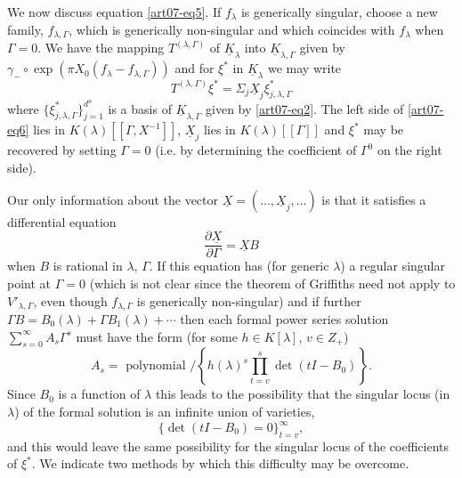 We now discuss equation \eqref{art07-eq5}. If $f_{\lambda}$ is generically singular, choose a new family, $f_{\lambda,\Gamma}$, which is generically non-singular and which coincides with $f_{\lambda}$ when $\Gamma=0$. We have the mapping $T^{(\lambda,\Gamma)}$ of $\underline{K}_{\lambda}$ into $\underline{K}_{\lambda,\Gamma}$ given by $\gamma_{-}\circ \exp (\pi X_{0}(f_{\lambda}-f_{\lambda,\Gamma}))$ and for $\xi^{*}$ in $\underline{K}_{\lambda}$ we may write
\begin{equation}
T^{(\lambda,\Gamma)}\xi^{*}=\Sigma_{j}\underline{X}_{j}\xi^{*}_{j,\lambda,\Gamma}\label{art07-eq7}
\end{equation}
where $\{\xi^{*}_{j,\lambda,\Gamma}\}^{d^{n}}_{j=1}$ is a basis of $\underline{K}_{\lambda,\Gamma}$ given by \eqref{art07-eq2}. The left side of \eqref{art07-eq6} lies in $K(\lambda)[[\Gamma,X^{-1}]]$, $\underline{X}_{j}$ lies in $K(\lambda)[[\Gamma]]$ and $\xi^{*}$ may be recovered by setting $\Gamma=0$ (i.e. by determining the coefficient of $\Gamma^{0}$ on the right side).

Our only information about the vector $\underline{X}=(\ldots,\underline{X}_{j},\ldots)$ is that it satisfies a differential equation
\begin{equation}
\dfrac{\partial \underline{X}}{\partial \Gamma}=\underline{X}B\label{art07-eq8}
\end{equation}\pageoriginale
when $B$ is rational in $\lambda$, $\Gamma$. If this equation has (for generic $\lambda$) a regular singular point at $\Gamma=0$ (which is not clear since the theorem of Griffiths need not apply to $V'_{\lambda,\Gamma}$, even though $f_{\lambda,\Gamma}$ is generically non-singular) and if further $\Gamma B=B_{0}(\lambda)+\Gamma B_{1}(\lambda)+\cdots$ then each formal power series solution $\sum\limits^{\infty}_{s=0}A_{s}\Gamma^{s}$ must have the form (for some $h\in K[\lambda]$, $v\in Z_{+}$)
$$
A_{s}=\text{~polynomial~}/\left\{h(\lambda)^{s}\prod\limits^{s}_{t=v}\det (tI-B_{0})\right\}.
$$
Since $B_{0}$ is a function of $\lambda$ this leads to the possibility that the singular locus (in $\lambda$) of the formal solution is an infinite union of varieties,
$$
\{\det (tI-B_{0})=0\}^{\infty}_{t=v},
$$
and this would leave the same possibility for the singular locus of the coefficients of $\xi^{*}$. We indicate two methods by which this difficulty may be overcome.

